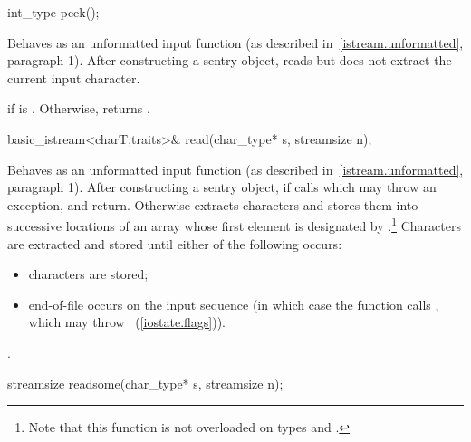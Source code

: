%
\begin{itemdecl}
int_type peek();
\end{itemdecl}

\begin{itemdescr}
\pnum
\effects
Behaves as an unformatted input function
(as described in~\ref{istream.unformatted}, paragraph 1).
After constructing a sentry object, reads but does not extract
the current input character.

\pnum
\returns
{}
if
is
.
Otherwise, returns
.
\end{itemdescr}

%
\begin{itemdecl}
basic_istream<charT,traits>& read(char_type* s, streamsize n);
\end{itemdecl}

\begin{itemdescr}
\pnum
\effects
Behaves as an unformatted input function (as described in~\ref{istream.unformatted}, paragraph 1).
After constructing
a sentry object, if
calls
which may throw an exception,
and return.
Otherwise extracts characters and stores them
into successive locations of an array whose first element is designated by
.\footnote{Note that this function is not overloaded on types
and
.}
Characters are extracted and stored until either of the following occurs:
\begin{itemize}
\item
{} characters are stored;
\item
end-of-file occurs on the input sequence
(in which case the function calls
,
which may throw
~(\ref{iostate.flags})).
\end{itemize}

\pnum
\returns
{}.
\end{itemdescr}

%
\begin{itemdecl}
streamsize readsome(char_type* s, streamsize n);
\end{itemdecl}

